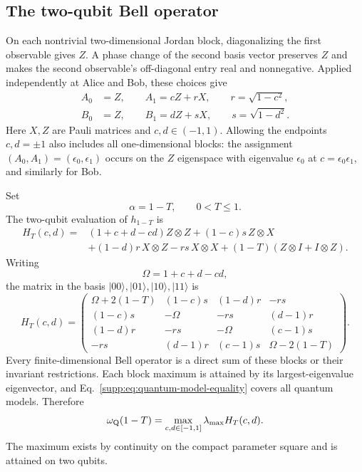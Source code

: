 \documentclass[aps,prl,onecolumn,10pt,superscriptaddress,nofootinbib,longbibliography]{revtex4-2}
\theoremstyle{remark}
\begin{document}
\subsection{The two-qubit Bell operator}

On each nontrivial two-dimensional Jordan block, diagonalizing the first observable gives $Z$. A phase change of the second basis vector preserves $Z$ and makes the second observable's off-diagonal entry real and nonnegative. Applied independently at Alice and Bob, these choices give
\begin{align}
A_0&=Z,\qquad A_1=cZ+rX,\qquad r=\sqrt{1-c^2},
\label{supp:eq:alice-block}\\
B_0&=Z,\qquad B_1=dZ+sX,\qquad s=\sqrt{1-d^2}.
\label{supp:eq:bob-block}
\end{align}
Here $X,Z$ are Pauli matrices and $c,d\in(-1,1)$. Allowing the endpoints $c,d=\pm1$ also includes all one-dimensional blocks: the assignment $(A_0,A_1)=(\epsilon_0,\epsilon_1)$ occurs on the $Z$ eigenspace with eigenvalue $\epsilon_0$ at $c=\epsilon_0\epsilon_1$, and similarly for Bob.

Set
\begin{equation}
\alpha=1-T,\qquad0<T\leq1.
\label{supp:eq:T-definition}
\end{equation}
The two-qubit evaluation of $h_{1-T}$ is
\begin{align}
H_T(c,d)
={}&(1+c+d-cd)Z\otimes Z+(1-c)s\,Z\otimes X
\nonumber\\
&+(1-d)r\,X\otimes Z-rs\,X\otimes X
+(1-T)(Z\otimes I+I\otimes Z).
\label{supp:eq:operator-decomposition}
\end{align}
Writing
\begin{equation}
\Omega=1+c+d-cd,
\label{supp:eq:omega-block}
\end{equation}
the matrix in the basis $|00\rangle,|01\rangle,|10\rangle,|11\rangle$ is
\begin{equation}
H_T(c,d)=
\begin{pmatrix}
\Omega+2(1-T)&(1-c)s&(1-d)r&-rs\\
(1-c)s&-\Omega&-rs&(d-1)r\\
(1-d)r&-rs&-\Omega&(c-1)s\\
-rs&(d-1)r&(c-1)s&\Omega-2(1-T)
\end{pmatrix}.
\label{supp:eq:block-matrix}
\end{equation}
Every finite-dimensional Bell operator is a direct sum of these blocks or their invariant restrictions. Each block maximum is attained by its largest-eigenvalue eigenvector, and Eq.~\eqref{supp:eq:quantum-model-equality} covers all quantum models. Therefore
\begin{equation}
\omega_{\rm Q}(1-T)=\max_{c,d\in[-1,1]}\lambda_{\max}H_T(c,d).
\label{supp:eq:block-maximum}
\end{equation}
The maximum exists by continuity on the compact parameter square and is attained on two qubits.
\end{document}
